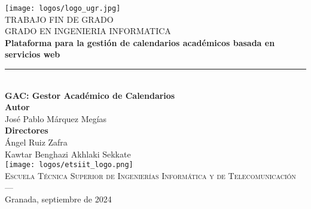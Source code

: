 \begin{titlepage}
\newlength{\centeroffset}
\setlength{\centeroffset}{-0.5\oddsidemargin}
\addtolength{\centeroffset}{0.5\evensidemargin}
\thispagestyle{empty}

\noindent\hspace*{\centeroffset}\begin{minipage}{\textwidth}

\centering
\texttt{[image: logos/logo\_ugr.jpg]}\\[1.4cm]

\textsc{ \Large TRABAJO FIN DE GRADO\\[0.2cm]}
\textsc{ GRADO EN INGENIERIA INFORMATICA}\\[1cm]

{\huge\bfseries Plataforma para la gestión de calendarios académicos basada en servicios web \\}
\noindent\rule[-1ex]{\textwidth}{3pt}\\[3.5ex]
{\large\bfseries GAC: Gestor Académico de Calendarios}\\
\vspace{1cm}
\textbf{Autor}\\ {José Pablo Márquez Megías}\\[2.5ex]
\textbf{Directores}\\ {Ángel Ruiz Zafra\\Kawtar Benghazi Akhlaki Sekkate}\\[2cm]
\texttt{[image: logos/etsiit\_logo.png]}\\[0.1cm]
\textsc{Escuela Técnica Superior de Ingenierías Informática y de Telecomunicación}\\
\textsc{---}\\
Granada, septiembre de 2024
\end{minipage}
\end{titlepage}
